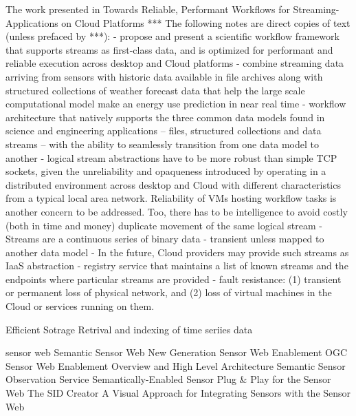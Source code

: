 The work presented in \cite{5948614} 
			Towards Reliable, Performant Workflows for Streaming-Applications on Cloud Platforms
			*** The following notes are direct copies of text (unless prefaced by ***):
				- propose and present a scientific workflow framework that supports streams as first-class data, and is optimized for performant and reliable execution across desktop and Cloud platforms
				- combine streaming data arriving from sensors with historic data available in file archives along with structured collections of weather forecast data that help the large scale computational model make an energy use prediction in near real time
				- workflow architecture that natively supports the three common data models found in science and engineering applications -- files, structured collections and data streams -- with the ability to seamlessly transition from one data model to another
				- logical stream abstractions have to be more robust than simple TCP sockets, given the unreliability and opaqueness introduced by operating in a distributed environment across desktop and Cloud with different characteristics from a typical local area network. Reliability of VMs hosting workflow tasks
is another concern to be addressed. Too, there has to be intelligence to avoid costly (both in time and money) duplicate movement of the same logical stream
				- Streams are a continuous series of binary data
				- transient unless mapped to another data model
				- In the future, Cloud providers may provide such streams as IaaS abstraction
				- registry service that maintains a list of known streams and the endpoints where particular
streams are provided
				- fault resistance: (1) transient or permanent loss of physical network, and (2) loss of virtual machines in the Cloud or services running on them.
			
			Efficient Sotrage Retrival and indexing of time seriies data
	
	sensor web	
		Semantic Sensor Web
		New Generation Sensor Web Enablement
		OGC Sensor Web Enablement Overview and High Level Architecture
		Semantic Sensor Observation Service
		Semantically-Enabled Sensor Plug \& Play for the Sensor Web
		The SID Creator A Visual Approach for Integrating Sensors with the Sensor Web
				
